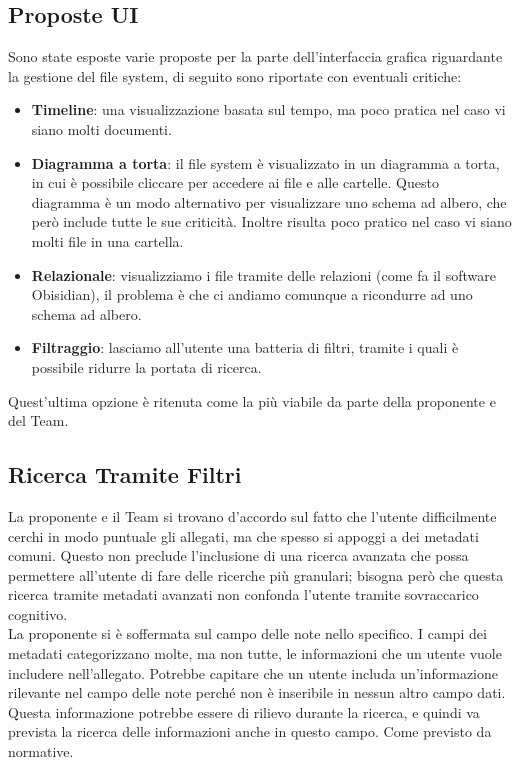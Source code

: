 \documentclass[a4paper,12pt]{article}
\begin{document}
\subsection{Proposte UI}
Sono state esposte varie proposte per la parte dell'interfaccia grafica riguardante la gestione del file system, di seguito sono riportate con eventuali critiche:
\begin{itemize}
    \item \textbf{Timeline}: una visualizzazione basata sul tempo, ma poco pratica nel caso vi siano molti documenti.
    \item \textbf{Diagramma a torta}: il file system è visualizzato in un diagramma a torta, in cui è possibile cliccare per accedere ai file e alle cartelle. Questo diagramma è un modo alternativo per visualizzare uno schema ad albero, che però include tutte le sue criticità. Inoltre risulta poco pratico nel caso vi siano molti file in una cartella.
    \item \textbf{Relazionale}: visualizziamo i file tramite delle relazioni (come fa il software Obisidian), il problema è che ci andiamo comunque a ricondurre ad uno schema ad albero.
    \item \textbf{Filtraggio}: lasciamo all'utente una batteria di filtri, tramite i quali è possibile ridurre la portata di ricerca.
\end{itemize}
Quest'ultima opzione è ritenuta come la più viabile da parte della proponente e del Team.

\subsection{Ricerca Tramite Filtri}
La proponente e il Team si trovano d'accordo sul fatto che l'utente difficilmente cerchi in modo puntuale gli allegati, ma che spesso si appoggi a dei metadati comuni. Questo non preclude l'inclusione di una ricerca avanzata che possa permettere all'utente di fare delle ricerche più granulari; bisogna però che questa ricerca tramite metadati avanzati non confonda l'utente tramite sovraccarico cognitivo. 
 \\ La proponente si è soffermata sul campo delle note nello specifico. I campi dei metadati categorizzano molte, ma non tutte, le informazioni che un utente vuole includere nell'allegato. Potrebbe capitare che un utente includa un'informazione rilevante nel campo delle note perché non è inseribile in nessun altro campo dati. Questa informazione potrebbe essere di rilievo durante la ricerca, e quindi va prevista la ricerca delle informazioni anche in questo campo.  Come previsto da normative.
\end{document}
